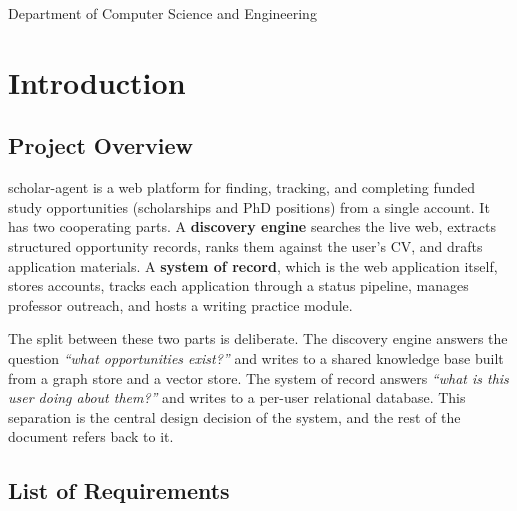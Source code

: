 \documentclass[11pt,a4paper]{article}
\begin{document}
\vfill
\begin{center}\small Department of Computer Science and Engineering\end{center}
\newpage

\section{Introduction}

\subsection{Project Overview}
scholar-agent is a web platform for finding, tracking, and completing funded study
opportunities (scholarships and PhD positions) from a single account. It has two cooperating
parts. A \textbf{discovery engine} searches the live web, extracts structured opportunity
records, ranks them against the user's CV, and drafts application materials. A \textbf{system
of record}, which is the web application itself, stores accounts, tracks each application
through a status pipeline, manages professor outreach, and hosts a writing practice module.

The split between these two parts is deliberate. The discovery engine answers the question
\emph{``what opportunities exist?''} and writes to a shared knowledge base built from a graph
store and a vector store. The system of record answers \emph{``what is this user doing about
them?''} and writes to a per-user relational database. This separation is the central design
decision of the system, and the rest of the document refers back to it.

\subsection{List of Requirements}
\end{document}
